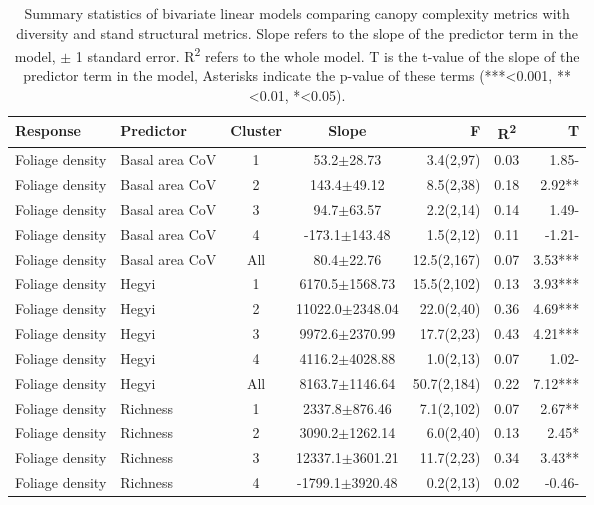 \begin{longtable}{llcS[table-format=5.1(4.2)]rS[table-format=1.2]r}
\caption{Summary statistics of bivariate linear models comparing canopy complexity metrics with diversity and stand structural metrics. Slope refers to the slope of the predictor term in the model, $\pm{}$ 1 standard error. R\textsuperscript{2} refers to the whole model. T is the t-value of the slope of the predictor term in the model, Asterisks indicate the p-value of these terms (***<0.001, **<0.01, *<0.05).} \\ 
  \toprule
{Response} & {Predictor} & {Cluster} & {Slope} & {F} & {R\textsuperscript{2}} & {T} \\ 
  \midrule
Foliage density & Basal area CoV & 1 & 53.2$\pm$28.73 & 3.4(2,97) & 0.03 & 1.85- \\ 
  Foliage density & Basal area CoV & 2 & 143.4$\pm$49.12 & 8.5(2,38) & 0.18 & 2.92** \\ 
  Foliage density & Basal area CoV & 3 & 94.7$\pm$63.57 & 2.2(2,14) & 0.14 & 1.49- \\ 
  Foliage density & Basal area CoV & 4 & -173.1$\pm$143.48 & 1.5(2,12) & 0.11 & -1.21- \\ 
  Foliage density & Basal area CoV & All & 80.4$\pm$22.76 & 12.5(2,167) & 0.07 & 3.53*** \\ 
   \midrule
Foliage density & Hegyi & 1 & 6170.5$\pm$1568.73 & 15.5(2,102) & 0.13 & 3.93*** \\ 
  Foliage density & Hegyi & 2 & 11022.0$\pm$2348.04 & 22.0(2,40) & 0.36 & 4.69*** \\ 
  Foliage density & Hegyi & 3 & 9972.6$\pm$2370.99 & 17.7(2,23) & 0.43 & 4.21*** \\ 
  Foliage density & Hegyi & 4 & 4116.2$\pm$4028.88 & 1.0(2,13) & 0.07 & 1.02- \\ 
  Foliage density & Hegyi & All & 8163.7$\pm$1146.64 & 50.7(2,184) & 0.22 & 7.12*** \\ 
   \midrule
Foliage density & Richness & 1 & 2337.8$\pm$876.46 & 7.1(2,102) & 0.07 & 2.67** \\ 
  Foliage density & Richness & 2 & 3090.2$\pm$1262.14 & 6.0(2,40) & 0.13 & 2.45* \\ 
  Foliage density & Richness & 3 & 12337.1$\pm$3601.21 & 11.7(2,23) & 0.34 & 3.43** \\ 
  Foliage density & Richness & 4 & -1799.1$\pm$3920.48 & 0.2(2,13) & 0.02 & -0.46- \\ 

\end{longtable}
